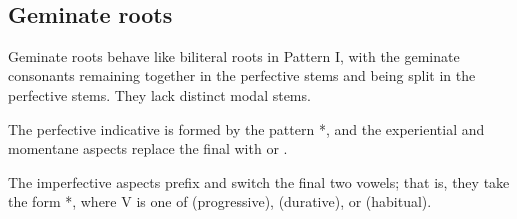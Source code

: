 \documentclass[grammar]{subfiles}
\begin{document}
\begin{table}[h!]\small\capstart
  \centering
  \\
  \caption{Pattern I biliteral stems \label{tab:vm_i_biliteral_stems}}
\end{table}


\subsection{Geminate roots}
\label{ssec:vm_i_geminate_roots}

Geminate roots behave like biliteral roots in Pattern I, with the geminate
consonants remaining together in the perfective stems and being split in the
perfective stems.  They lack distinct modal stems. 

The perfective indicative is formed by the pattern *, and the
experiential and momentane aspects replace the final  with  or
.

The imperfective aspects prefix  and switch the final two vowels; that
is, they take the form *, where V is one of 
(progressive),  (durative), or  (habitual).
\end{document}
